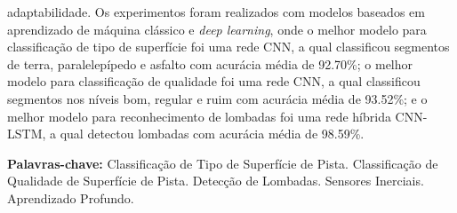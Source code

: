 \begin{resumo}[Resumo]
adaptabilidade. Os experimentos foram realizados com modelos baseados em aprendizado de máquina clássico e \textit{deep learning}, onde o melhor modelo para classificação de tipo de superfície foi uma rede CNN, a qual classificou segmentos de terra, paralelepípedo e asfalto com acurácia média de 92.70\%; o melhor modelo para classificação de qualidade foi uma rede CNN, a qual classificou segmentos nos níveis bom, regular e ruim com acurácia média de 93.52\%; e o melhor modelo para reconhecimento de lombadas foi uma rede híbrida CNN-LSTM, a qual detectou lombadas com acurácia média de 98.59\%.
    
  \vspace{\baselineskip} 
  \textbf{Palavras-chave:} 
  Classificação de Tipo de Superfície de Pista.
  Classificação de Qualidade de Superfície de Pista.
  Detecção de Lombadas.
  Sensores Inerciais. 
  Aprendizado Profundo.
  
\end{resumo}
